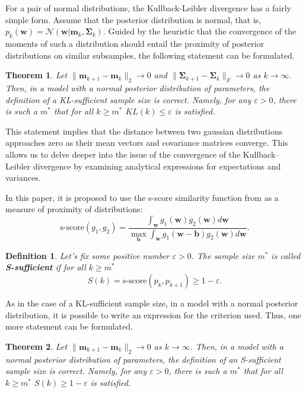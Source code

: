 \documentclass[sn-mathphys-num]{sn-jnl}%
\newtheorem{theorem}{Theorem}%
\newtheorem{definition}{Definition}%
\begin{document}
For a pair of normal distributions, the Kullback-Leibler divergence has a fairly simple form. Assume that the posterior distribution is normal, that is, $p_k(\mathbf{w}) = \mathcal{N}\left(\mathbf{w}|\mathbf{m}_k, \mathbf{\Sigma}_k\right)$. Guided by the heuristic that the convergence of the moments of such a distribution should entail the proximity of posterior distributions on similar subsamples, the following statement can be formulated.

\begin{theorem}\label{theorem1}
    Let $\|\mathbf{m}_{k+1} - \mathbf{m}_k\|_2 \to 0$ and $\|\mathbf{\Sigma}_{k+1} - \mathbf{\Sigma}_k\|_{F}\to 0$ as $k\to \infty$. Then, in a model with a normal posterior distribution of parameters, the definition of a KL-sufficient sample size is correct. Namely, for any $\varepsilon > 0$, there is such a $m^*$ that for all $k\geqslant m^*$ $KL(k)\leqslant\varepsilon$ is satisfied.
\end{theorem}

This statement implies that the distance between two gaussian distributions approaches zero as their mean vectors and covariance matrices converge. This allows us to delve deeper into the issue of the convergence of the Kullback–Leibler divergence by examining analytical expressions for expectations and variances.

In this paper, it is proposed to use the s-score similarity function from \cite{Aduenko2017} as a measure of proximity of distributions:
\[\text{s-score}(g_1, g_2) = \frac{\int_{\mathbf{w}} g_1(\mathbf{w}) g_2(\mathbf{w}) d\mathbf{w}}{\max_{\mathbf{b}} \int_{\mathbf{w}} g_1(\mathbf{w} - \mathbf{b}) g_2(\mathbf{w}) d\mathbf{w}}. \]

\begin{definition}
    Let's fix some positive number $\varepsilon > 0$. The sample size $m^*$ is called \textbf{S-sufficient} if for all $k\geqslant m^*$
    \[ S(k) = \text{s-score}(p_k, p_{k+1}) \geqslant 1-\varepsilon. \]
\end{definition}

As in the case of a KL-sufficient sample size, in a model with a normal posterior distribution, it is possible to write an expression for the criterion used. Thus, one more statement can be formulated.

\begin{theorem}\label{theorem2}
    Let $\|\mathbf{m}_{k+1} - \mathbf{m}_k\|_2\to 0$ as $k \to \infty$. Then, in a model with a normal posterior distribution of parameters, the definition of an S-sufficient sample size is correct. Namely, for any $\varepsilon > 0$, there is such a $m^*$ that for all $k\geqslant m^*$ $S(k)\geqslant 1-\varepsilon$ is satisfied.
\end{theorem}
\end{document}
